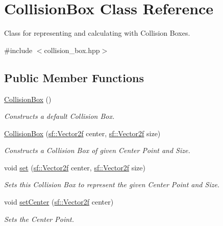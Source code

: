 \hypertarget{class_collision_box}{}\section{Collision\+Box Class Reference}
\label{class_collision_box}


Class for representing and calculating with Collision Boxes.  




{\ttfamily \#include $<$collision\+\_\+box.\+hpp$>$}

\subsection*{Public Member Functions}
\begin{DoxyCompactItemize}
\item 
\mbox{\label{class_collision_box_a11e887724dd21a42caa87411018de342}} 
\mbox{\hyperlink{class_collision_box_a11e887724dd21a42caa87411018de342}{Collision\+Box}} ()
\begin{DoxyCompactList}\small\item\em Constructs a default Collision Box. \end{DoxyCompactList}\item 
\mbox{\hyperlink{class_collision_box_a9714aa713ba638effe0603f060a1e5ca}{Collision\+Box}} (\mbox{\hyperlink{classsf_1_1_vector2}{sf\+::\+Vector2f}} center, \mbox{\hyperlink{classsf_1_1_vector2}{sf\+::\+Vector2f}} size)
\begin{DoxyCompactList}\small\item\em Constructs a Collision Box of given Center Point and Size. \end{DoxyCompactList}\item 
void \mbox{\hyperlink{class_collision_box_a7861207a262fc88e2ee5a4a1ab47ea47}{set}} (\mbox{\hyperlink{classsf_1_1_vector2}{sf\+::\+Vector2f}} center, \mbox{\hyperlink{classsf_1_1_vector2}{sf\+::\+Vector2f}} size)
\begin{DoxyCompactList}\small\item\em Sets this Collision Box to represent the given Center Point and Size. \end{DoxyCompactList}\item 
void \mbox{\hyperlink{class_collision_box_a868aa6d282777f5775bd598d91e31be0}{set\+Center}} (\mbox{\hyperlink{classsf_1_1_vector2}{sf\+::\+Vector2f}} center)
\begin{DoxyCompactList}\small\item\em Sets the Center Point. \end{DoxyCompactList}\item 

\end{DoxyCompactItemize}
